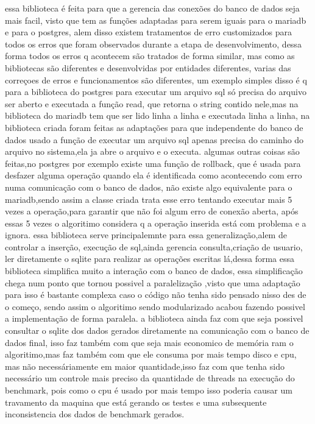 \documentclass[
	12pt,				%
	openright,			%
	oneside,			%
	a4paper,			%
	english,			%
	french,				%
	spanish,			%
	brazil,				%
	]{abntex2}
\begin{document}
essa biblioteca é feita para que a gerencia das conexões do banco de dados seja mais facil,
visto que tem as funções adaptadas para serem iguais para o mariadb e para o postgres,
alem disso existem tratamentos de erro customizados para todos os erros que foram observados durante a etapa de desenvolvimento,
dessa forma todos os erros q acontecem são tratados de forma similar,
mas como as bibliotecas são diferentes e desenvolvidas por entidades diferentes,
varias das correçoes de erros e funcionamentos são diferentes,
um exemplo simples disso é q para a biblioteca do postgres para executar um arquivo sql só precisa do arquivo ser aberto e executada a função read,
que retorna o string contido nele,mas na biblioteca do mariadb tem que ser lido linha a linha e executada linha a linha,
na biblioteca criada foram feitas as adaptações para que independente do banco de dados usado a função de executar um arquivo sql apenas precisa do caminho do arquivo no sistema,ela ja abre o arquivo e o executa.
algumas outras coisas são feitas,no postgres por exemplo existe uma função de rollback,
que é usada para desfazer alguma operação quando ela é identificada como acontecendo com erro numa comunicação com o banco de dados,
não existe algo equivalente para o mariadb,sendo assim a classe criada trata esse erro tentando executar mais 5 vezes a operação,para garantir que não foi algum erro de conexão aberta,
após essas 5 vezes o algoritimo considera q a operação inserida está com problema e a ignora.
essa biblioteca serve principalemnte para essa generalização,alem de controlar a inserção,
execução de sql,ainda gerencia consulta,criação de usuario,
ler diretamente o sqlite para realizar as operações escritas lá,dessa forma essa biblioteca simplifica muito a interação com o banco de dados,
essa simplificação chega num ponto que tornou possivel a paralelização ,visto que uma adaptação para isso é bastante complexa caso o código não tenha sido pensado nisso des de o começo,
sendo assim o algoritimo sendo modularizado acabou fazendo possivel a implementação de forma paralela.
a biblioteca ainda faz com que seja possivel consultar o sqlite dos dados gerados diretamente na comunicação com o banco de dados final,
isso faz também com que seja mais economico de memória ram o algoritimo,mas faz também com que ele consuma por mais tempo disco e cpu,
mas não necessáriamente em maior quantidade,isso faz com que tenha sido necessário um controle mais preciso da quantidade de threads na execução do benchmark,
pois como o cpu é usado por mais tempo isso poderia causar um travamento da maquina que está gerando os testes e uma subsequente inconsistencia dos dados de benchmark gerados.
\end{document}
